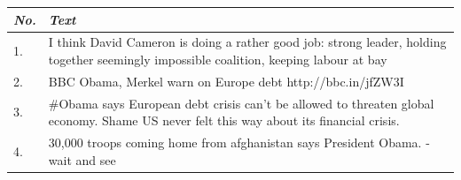 \begin{tabular}{ | l | p{4in} | }
	\hline
	\textbf{\emph{No.}} & \textbf{\emph{Text}} \\
	\hline
	1. & I think David Cameron is doing a rather good job: strong leader, holding together seemingly impossible coalition, keeping labour at bay \\ %
	\hline
	2. & BBC Obama, Merkel warn on Europe debt http://bbc.in/jfZW3I \\ %
	\hline
	3. & \#Obama says European debt crisis can't be allowed to threaten global economy. Shame US never felt this way about its financial crisis. \\ %
	\hline
	4. & 30,000 troops coming home from afghanistan says President Obama. - wait and see \\
	\hline
\end{tabular}





